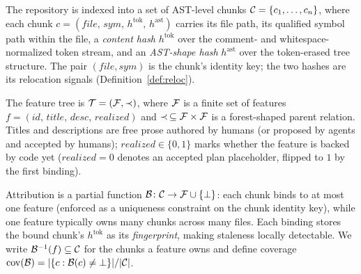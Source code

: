 \begin{definition}
\label{def:chunks}
The repository is indexed into a set of AST-level chunks
$\mathcal{C} = \{c_1, \dots, c_n\}$, where each chunk
$c = (\mathit{file},\, \mathit{sym},\, h^{\mathrm{tok}},\, h^{\mathrm{ast}})$
carries its file path, its qualified symbol path within the file, a
\emph{content hash} $h^{\mathrm{tok}}$ over the comment- and
whitespace-normalized token stream, and an \emph{AST-shape hash}
$h^{\mathrm{ast}}$ over the token-erased tree structure. The pair
$(\mathit{file}, \mathit{sym})$ is the chunk's identity key; the two hashes are
its relocation signals (Definition~\ref{def:reloc}).
\end{definition}

\begin{definition}
\label{def:tree}
The feature tree is $\mathcal{T} = (\mathcal{F}, \prec)$, where $\mathcal{F}$ is a finite set of features
$f = (\mathit{id},\, \mathit{title},\, \mathit{desc},\, \mathit{realized})$ and
$\prec\, \subseteq \mathcal{F} \times \mathcal{F}$ is a forest-shaped parent relation. Titles and
descriptions are free prose authored by humans (or proposed by agents and
accepted by humans); $\mathit{realized} \in \{0,1\}$ marks whether the feature
is backed by code yet ($\mathit{realized}=0$ denotes an accepted plan
placeholder, flipped to $1$ by the first binding).
\end{definition}

\begin{definition}
\label{def:binding}
Attribution is a partial function $\mathcal{B} \colon \mathcal{C} \to \mathcal{F} \cup \{\bot\}$: each
chunk binds to at most one feature (enforced as a uniqueness constraint on the
chunk identity key), while one feature typically owns many chunks across many
files. Each binding stores the bound chunk's $h^{\mathrm{tok}}$ as its
\emph{fingerprint}, making staleness locally detectable. We write
$\mathcal{B}^{-1}(f) \subseteq \mathcal{C}$ for the chunks a feature owns and define coverage
$\mathrm{cov}(\mathcal{B}) = \lvert\{c : \mathcal{B}(c) \neq \bot\}\rvert / \lvert\mathcal{C}\rvert$.
\end{definition}

